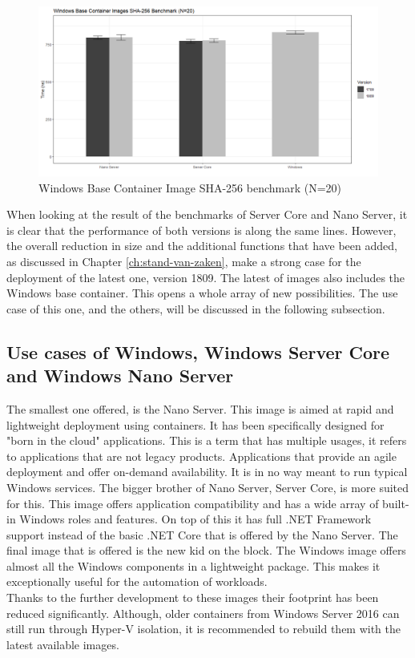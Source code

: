 \begin{figure}[h]
	\captionsetup{width=0.8\linewidth}
	\includegraphics[width=0.9\linewidth]{img/Methodologie/Containers2.png}
	\centering
	\caption[SHA-256 benchmark]{Windows Base Container Image SHA-256 benchmark (N=20)}
	\label{fig:SHA}
\end{figure}

 When looking at the result of the benchmarks of Server Core and Nano Server, it is clear that the performance of both versions is along the same lines. However, the overall reduction in size and the additional functions that have been added, as discussed in Chapter \ref{ch:stand-van-zaken}, make a strong case for the deployment of the latest one, version 1809. The latest of images also includes the Windows base container. This opens a whole array of new possibilities. The use case of this one, and the others, will be discussed in the following subsection.

\subsection{Use cases of Windows, Windows Server Core and Windows Nano Server}
The smallest one offered, is the Nano Server. This image is aimed at rapid and lightweight deployment using containers. It has been specifically designed for "born in the cloud" applications. This is a term that has multiple usages, it refers to applications that are not legacy products. Applications that provide an agile deployment and offer on-demand availability. It is in no way meant to run typical Windows services. The bigger brother of Nano Server, Server Core, is more suited for this. 
This image offers application compatibility and has a wide array of built-in Windows roles and features. On top of this it has full .NET Framework support instead of the basic .NET Core that is offered by the Nano Server. 
The final image that is offered is the new kid on the block. The Windows image offers almost all the Windows components in a lightweight package. This makes it exceptionally useful for the automation of workloads. 
\\
Thanks to the further development to these images their footprint has been reduced significantly. Although, older containers from Windows Server 2016 can still run through Hyper-V isolation, it is recommended to rebuild them with the latest available images.




